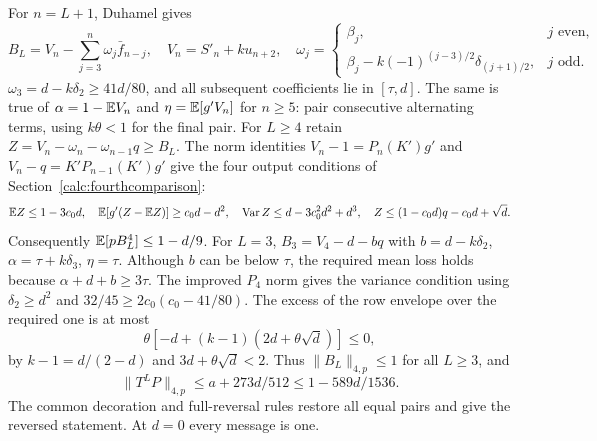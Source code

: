 For $n=L+1$, Duhamel gives
\[
 B_L=V_n-\sum_{j=3}^n\omega_j\bar f_{n-j},\quad
 V_n=S'_n+ku_{n+2},\quad
 \omega_j=\begin{cases}\beta_j,&j\text{ even},\\
 \beta_j-k(-1)^{(j-3)/2}\delta_{(j+1)/2},&j\text{ odd}.
 \end{cases}
\]
$\omega_3=d-k\delta_{2}\ge41d/80$, and all subsequent coefficients lie in
$[\tau,d]$. The same is true of
$\alpha=1-\mathbb E V_n$ and $\eta=\mathbb E[g'V_n]$ for $n\ge5$:
pair consecutive alternating terms, using $k\theta<1$ for the final pair.
For $L\ge4$ retain $Z=V_n-\omega_n-\omega_{n-1}q\ge B_L$.
The norm identities
$V_n-1=P_n(K')g'$ and $V_n-q=K'P_{n-1}(K')g'$
give the four output conditions of Section~\ref{calc:fourthcomparison}:
\[
 \mathbb E Z\le1-3c_0d,\quad \mathbb E[g'(Z-\mathbb E Z)]\ge c_0d-d^2,
 \quad\operatorname{Var}Z\le d-3c_0^2d^2+d^3,
 \quad Z\le(1-c_0d)q-c_0d+\sqrt d.
\]
Consequently $\mathbb E[pB_L^4]\le1-d/9$.
For $L=3$, $B_3=V_4-d-bq$ with
$b=d-k\delta_{2}$, $\alpha=\tau+k\delta_{3}$, $\eta=\tau$.
Although $b$ can be below $\tau$, the required mean loss holds because
$\alpha+d+b\ge3\tau$. The improved $P_4$ norm gives the variance condition
using $\delta_{2}\ge d^2$ and $32/45\ge2c_0(c_0-41/80)$.
The excess of the row envelope over the required one is at most
\[
 \theta[-d+(k-1)(2d+\theta\sqrt d)]\le0,
\]
by $k-1=d/(2-d)$ and $3d+\theta\sqrt d<2$.
Thus $\|B_L\|_{4,p}\le1$ for all $L\ge3$, and
\[
 \|T^LP\|_{4,p}\le a+273d/512
          \le1-589d/1536.
\]
The common decoration and full-reversal rules restore all equal pairs
and give the reversed statement. At $d=0$ every message is one.
